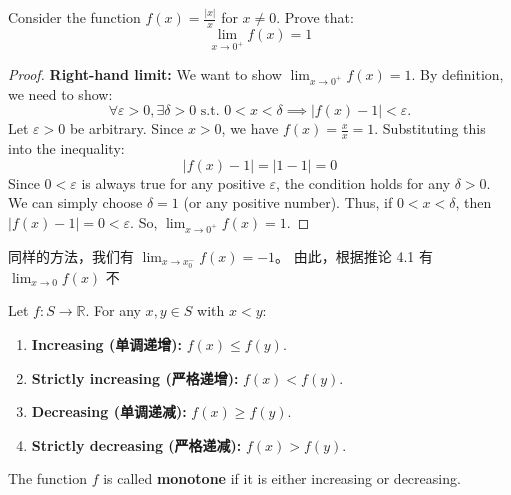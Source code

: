 \documentclass[
	UTF-8,
	11pt, %
	a4paper, %
]{LegrandOrangeBook}
\begin{document}
    \begin{example}
    Consider the function $f(x) = \frac{|x|}{x}$ for $x \neq 0$. 
    Prove that:
    \[ \lim_{x \to 0^+} f(x) = 1 \]

    \begin{proof}
        \textbf{ Right-hand limit:}
        We want to show $\lim_{x \to 0^+} f(x) = 1$.
        By definition, we need to show:
        \[ \forall \varepsilon > 0, \exists \delta > 0 \text{ s.t. } 0 < x < \delta \implies |f(x) - 1| < \varepsilon. \]
        Let $\varepsilon > 0$ be arbitrary.
        Since $x > 0$, we have $f(x) = \frac{x}{x} = 1$.
        Substituting this into the inequality:
        \[ |f(x) - 1| = |1 - 1| = 0 \]
        Since $0 < \varepsilon$ is always true for any positive $\varepsilon$, 
        the condition holds for any $\delta > 0$.
        We can simply choose $\delta = 1$ (or any positive number).
        Thus, if $0 < x < \delta$, then $|f(x) - 1| = 0 < \varepsilon$.
        So, $\displaystyle\lim_{x \to 0^+} f(x) = 1$.
    \end{proof}
    \begin{remark}
        同样的方法，我们有 $\displaystyle \lim_{x \to x_0^-} f(x) = -1$。
        由此，根据推论 4.1 有 $\displaystyle\lim_{x \to 0} f(x)$ 不
    \end{remark}

    \end{example}


    \newpage

    \begin{definition}
    Let $f: S \to \mathbb{R}$. For any $x, y \in S$ with $x < y$:
    \begin{enumerate}
        \item \textbf{Increasing (单调递增):} $f(x) \le f(y)$.
        \item \textbf{Strictly increasing (严格递增):} $f(x) < f(y)$.
        \item \textbf{Decreasing (单调递减):} $f(x) \ge f(y)$.
        \item \textbf{Strictly decreasing (严格递减):} $f(x) > f(y)$.
    \end{enumerate}
    The function $f$ is called \textbf{monotone} if it is either increasing or decreasing.
    \end{definition}
\end{document}
